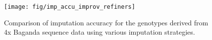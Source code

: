\begin{figure}[htp]
\centering
\texttt{[image: fig/imp\_accu\_improv\_refiners]}
\caption{Comparison of imputation accuracy for the genotypes derived from 4x Baganda sequence data using various imputation strategies.}
\label{fig:imp_accu_improv_refiners}
\end{figure}